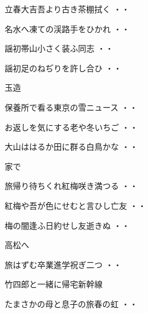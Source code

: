 \vspace{0.6cm}
\begin{shiika}立春大吉吾より古き茶棚拭く
\hfill{・・}\end{shiika}
\vspace{0.6cm}
\begin{shiika}名水へ凍ての渓路手をひかれ
\hfill{・・}\end{shiika}
\vspace{0.6cm}
\begin{shiika}謡初帯山小さく装ふ同志
\hfill{・・}\end{shiika}
\vspace{0.6cm}
\begin{shiika}謡初足のねぢりを許し合ひ
\hfill{・・}\end{shiika}
\vspace{0.6cm}
玉造
\begin{shiika}保養所で看る東京の雪ニュース
\hfill{・・}\end{shiika}
\begin{shiika}お返しを気にする老や冬いちご
\hfill{・・}\end{shiika}
\begin{shiika}大山ははるか田に群る白鳥かな
\hfill{・・}\end{shiika}
\vspace{0.6cm}
家で
\begin{shiika}旅帰り待ちくれ紅梅咲き満つる
\hfill{・・}\end{shiika}
\begin{shiika}紅梅や吾が色にせむと言ひし亡友
\hfill{・・}\end{shiika}
\begin{shiika}梅の闇逢ふ日約せし友逝きぬ
\hfill{・・}\end{shiika}
\vspace{0.6cm}
高松へ
\begin{shiika}旅はずむ卒業進学祝ぎ二つ
\hfill{・・}\end{shiika}
\vspace{0.6cm}
竹四郎と一緒に帰宅新幹線
\begin{shiika}たまさかの母と息子の旅春の虹
\hfill{・・}\end{shiika}
